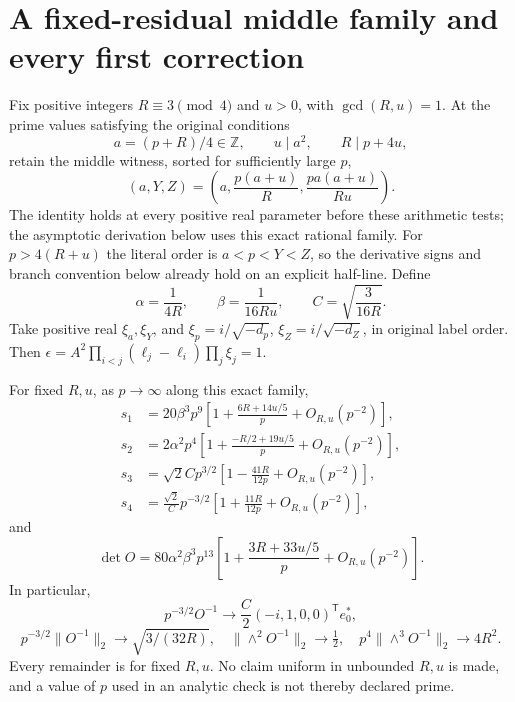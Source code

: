 \section{A fixed-residual middle family and every first correction}
Fix positive integers $R\equiv3\pmod4$ and $u>0$, with $\gcd(R,u)=1$. At the prime
values satisfying the original conditions
\[
 a=(p+R)/4\in\mathbb Z,\qquad u\mid a^2,\qquad R\mid p+4u,
\]
retain the middle witness, sorted for sufficiently large $p$,
\begin{equation}\label{eq:family}
 (a,Y,Z)=\left(a,\frac{p(a+u)}R,\frac{pa(a+u)}{Ru}\right).
\end{equation}
The identity holds at every positive real parameter before these arithmetic
tests; the asymptotic derivation below uses this exact rational family.
For $p>4(R+u)$ the literal order is $a<p<Y<Z$, so the derivative signs
and branch convention below already hold on an explicit half-line.
Define
\[
 \alpha=\frac1{4R},\qquad \beta=\frac1{16Ru},\qquad
 C=\sqrt{\frac3{16R}}.
\]
Take positive real $\xi_a,\xi_Y$, and
$\xi_p=i/\sqrt{-d_p}$, $\xi_Z=i/\sqrt{-d_Z}$, in original label order.
Then $\epsilon=A^2\prod_{i<j}(\ell_j-\ell_i)\prod_j\xi_j=1$.

\begin{theorem}\label{thm:spectrum}
For fixed $R,u$, as $p\to\infty$ along this exact family,
\begin{align*}
 s_1&=20\beta^3p^9\left[1+\frac{6R+14u/5}{p}+O_{R,u}(p^{-2})\right],\\
 s_2&=2\alpha^2p^4\left[1+\frac{-R/2+19u/5}{p}+O_{R,u}(p^{-2})\right],\\
 s_3&=\sqrt2 C p^{3/2}\left[1-\frac{41R}{12p}+O_{R,u}(p^{-2})\right],\\
 s_4&=\frac{\sqrt2}{C}p^{-3/2}\left[1+\frac{11R}{12p}+O_{R,u}(p^{-2})\right],
\end{align*}
and
\begin{equation}\label{eq:detexp}
 \det O=80\alpha^2\beta^3p^{13}
 \left[1+\frac{3R+33u/5}{p}+O_{R,u}(p^{-2})\right].
\end{equation}
In particular,
\[
 p^{-3/2}O^{-1}\longrightarrow\frac C2(-i,1,0,0)^{\mathsf T}e_0^*,
\]
\[
 p^{-3/2}\|O^{-1}\|_2\to\sqrt{3/(32R)},\quad
 \|\wedge^2O^{-1}\|_2\to\tfrac12,\quad
 p^4\|\wedge^3O^{-1}\|_2\to4R^2.
\]
Every remainder is for fixed $R,u$. No claim uniform in unbounded $R,u$ is
made, and a value of $p$ used in an analytic check is not thereby declared prime.
\end{theorem}

